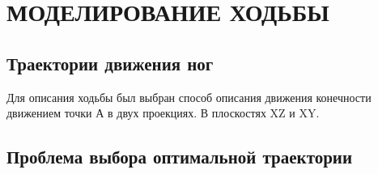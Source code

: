\chapter{\MakeUppercase{Моделирование ходьбы}}
\section{Траектории движения ног}
Для описания ходьбы был выбран способ описания движения конечности движением точки А в двух проекциях. В плоскостях XZ и XY.

\section{Проблема выбора оптимальной траектории}